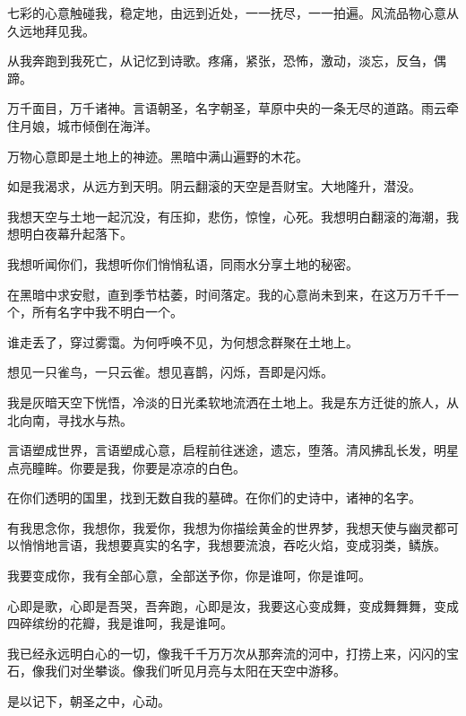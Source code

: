 \documentclass[UTF8]{article}
\begin{document}
\par 七彩的心意触碰我，稳定地，由远到近处，一一抚尽，一一拍遍。风流品物心意从久远地拜见我。
\par 从我奔跑到我死亡，从记忆到诗歌。疼痛，紧张，恐怖，激动，淡忘，反刍，偶蹄。
\par 万千面目，万千诸神。言语朝圣，名字朝圣，草原中央的一条无尽的道路。雨云牵住月娘，城市倾倒在海洋。
\par 万物心意即是土地上的神迹。黑暗中满山遍野的木花。
\par 如是我渴求，从远方到天明。阴云翻滚的天空是吾财宝。大地隆升，潜没。
\par 我想天空与土地一起沉没，有压抑，悲伤，惊惶，心死。我想明白翻滚的海潮，我想明白夜幕升起落下。
\par 我想听闻你们，我想听你们悄悄私语，同雨水分享土地的秘密。
\par 在黑暗中求安慰，直到季节枯萎，时间落定。我的心意尚未到来，在这万万千千一个，所有名字中我不明白一个。
\par 谁走丢了，穿过雾霭。为何呼唤不见，为何想念群聚在土地上。
\par 想见一只雀鸟，一只云雀。想见喜鹊，闪烁，吾即是闪烁。
\par 我是灰暗天空下恍悟，冷淡的日光柔软地流洒在土地上。我是东方迁徙的旅人，从北向南，寻找水与热。
\par 言语塑成世界，言语塑成心意，启程前往迷途，遗忘，堕落。清风拂乱长发，明星点亮瞳眸。你要是我，你要是凉凉的白色。
\par 在你们透明的国里，找到无数自我的墓碑。在你们的史诗中，诸神的名字。
\par 有我思念你，我想你，我爱你，我想为你描绘黄金的世界梦，我想天使与幽灵都可以悄悄地言语，我想要真实的名字，我想要流浪，吞吃火焰，变成羽类，鳞族。
\par 我要变成你，我有全部心意，全部送予你，你是谁呵，你是谁呵。
\par 心即是歌，心即是吾哭，吾奔跑，心即是汝，我要这心变成舞，变成舞舞舞，变成四碎缤纷的花瓣，我是谁呵，我是谁呵。
\par 我已经永远明白心的一切，像我千千万万次从那奔流的河中，打捞上来，闪闪的宝石，像我们对坐攀谈。像我们听见月亮与太阳在天空中游移。
\par 是以记下，朝圣之中，心动。
\end{document}
